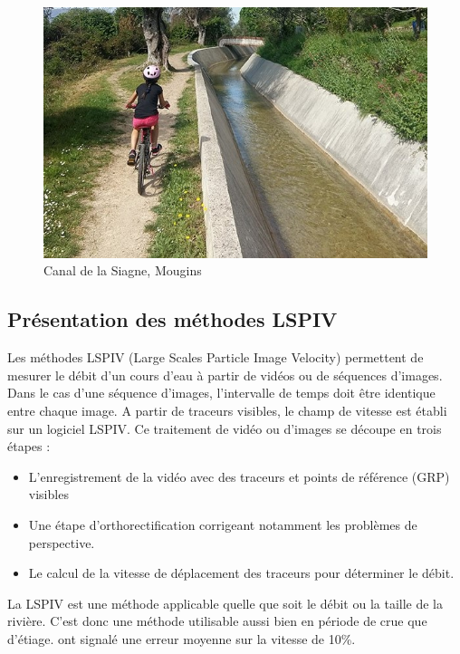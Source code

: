 \documentclass[
]{article}
\providecommand{\tightlist}{%
  \setlength{\itemsep}{0pt}\setlength{\parskip}{0pt}}
\begin{document}
\begin{figure}[H]
\includegraphics[width=1\linewidth,]{images/canal} \caption{Canal de la Siagne, Mougins}\label{fig:refcanal}
\end{figure}

\hypertarget{pruxe9sentation-des-muxe9thodes-lspiv}{%
\subsection{Présentation des méthodes LSPIV}\label{pruxe9sentation-des-muxe9thodes-lspiv}}

Les méthodes LSPIV (Large Scales Particle Image Velocity) permettent de mesurer le débit d'un cours d'eau à partir de vidéos ou de séquences d'images. Dans le cas d'une séquence d'images, l'intervalle de temps doit être identique entre chaque image. A partir de traceurs visibles, le champ de vitesse est établi sur un logiciel LSPIV. Ce traitement de vidéo ou d'images se découpe en trois étapes :

\begin{itemize}
\tightlist
\item
  L'enregistrement de la vidéo avec des traceurs et points de référence (GRP) visibles
\item
  Une étape d'orthorectification corrigeant notamment les problèmes de perspective.
\item
  Le calcul de la vitesse de déplacement des traceurs pour déterminer le débit.
\end{itemize}

La LSPIV est une méthode applicable quelle que soit le débit ou la taille de la rivière. C'est donc une méthode utilisable aussi bien en période de crue que d'étiage. \citep{muste_large-scale_2008} ont signalé une erreur moyenne sur la vitesse de 10\%.
\end{document}
